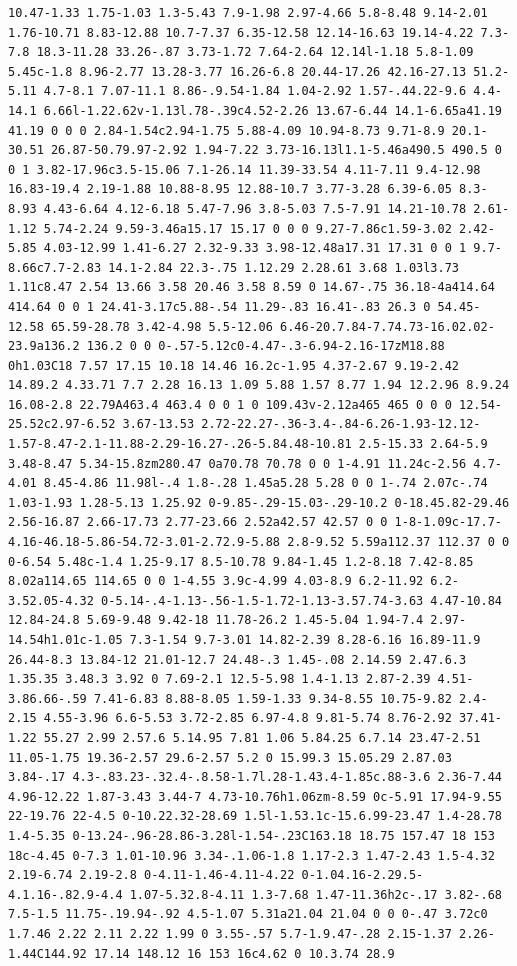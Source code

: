 \documentclass[11pt]{article}
\begin{document}
\begin{enumerate}
\begin{verbatim}
10.47-1.33 1.75-1.03 1.3-5.43 7.9-1.98 2.97-4.66 5.8-8.48 9.14-2.01 1.76-10.71 8.83-12.88 10.7-7.37 6.35-12.58 12.14-16.63 19.14-4.22 7.3-7.8 18.3-11.28 33.26-.87 3.73-1.72 7.64-2.64 12.14l-1.18 5.8-1.09 5.45c-1.8 8.96-2.77 13.28-3.77 16.26-6.8 20.44-17.26 42.16-27.13 51.2-5.11 4.7-8.1 7.07-11.1 8.86-.9.54-1.84 1.04-2.92 1.57-.44.22-9.6 4.4-14.1 6.66l-1.22.62v-1.13l.78-.39c4.52-2.26 13.67-6.44 14.1-6.65a41.19 41.19 0 0 0 2.84-1.54c2.94-1.75 5.88-4.09 10.94-8.73 9.71-8.9 20.1-30.51 26.87-50.79.97-2.92 1.94-7.22 3.73-16.13l1.1-5.46a490.5 490.5 0 0 1 3.82-17.96c3.5-15.06 7.1-26.14 11.39-33.54 4.11-7.11 9.4-12.98 16.83-19.4 2.19-1.88 10.88-8.95 12.88-10.7 3.77-3.28 6.39-6.05 8.3-8.93 4.43-6.64 4.12-6.18 5.47-7.96 3.8-5.03 7.5-7.91 14.21-10.78 2.61-1.12 5.74-2.24 9.59-3.46a15.17 15.17 0 0 0 9.27-7.86c1.59-3.02 2.42-5.85 4.03-12.99 1.41-6.27 2.32-9.33 3.98-12.48a17.31 17.31 0 0 1 9.7-8.66c7.7-2.83 14.1-2.84 22.3-.75 1.12.29 2.28.61 3.68 1.03l3.73 1.11c8.47 2.54 13.66 3.58 20.46 3.58 8.59 0 14.67-.75 36.18-4a414.64 414.64 0 0 1 24.41-3.17c5.88-.54 11.29-.83 16.41-.83 26.3 0 54.45-12.58 65.59-28.78 3.42-4.98 5.5-12.06 6.46-20.7.84-7.74.73-16.02.02-23.9a136.2 136.2 0 0 0-.57-5.12c0-4.47-.3-6.94-2.16-17zM18.88 0h1.03C18 7.57 17.15 10.18 14.46 16.2c-1.95 4.37-2.67 9.19-2.42 14.89.2 4.33.71 7.7 2.28 16.13 1.09 5.88 1.57 8.77 1.94 12.2.96 8.9.24 16.08-2.8 22.79A463.4 463.4 0 0 1 0 109.43v-2.12a465 465 0 0 0 12.54-25.52c2.97-6.52 3.67-13.53 2.72-22.27-.36-3.4-.84-6.26-1.93-12.12-1.57-8.47-2.1-11.88-2.29-16.27-.26-5.84.48-10.81 2.5-15.33 2.64-5.9 3.48-8.47 5.34-15.8zm280.47 0a70.78 70.78 0 0 1-4.91 11.24c-2.56 4.7-4.01 8.45-4.86 11.98l-.4 1.8-.28 1.45a5.28 5.28 0 0 1-.74 2.07c-.74 1.03-1.93 1.28-5.13 1.25.92 0-9.85-.29-15.03-.29-10.2 0-18.45.82-29.46 2.56-16.87 2.66-17.73 2.77-23.66 2.52a42.57 42.57 0 0 1-8-1.09c-17.7-4.16-46.18-5.86-54.72-3.01-2.72.9-5.88 2.8-9.52 5.59a112.37 112.37 0 0 0-6.54 5.48c-1.4 1.25-9.17 8.5-10.78 9.84-1.45 1.2-8.18 7.42-8.85 8.02a114.65 114.65 0 0 1-4.55 3.9c-4.99 4.03-8.9 6.2-11.92 6.2-3.52.05-4.32 0-5.14-.4-1.13-.56-1.5-1.72-1.13-3.57.74-3.63 4.47-10.84 12.84-24.8 5.69-9.48 9.42-18 11.78-26.2 1.45-5.04 1.94-7.4 2.97-14.54h1.01c-1.05 7.3-1.54 9.7-3.01 14.82-2.39 8.28-6.16 16.89-11.9 26.44-8.3 13.84-12 21.01-12.7 24.48-.3 1.45-.08 2.14.59 2.47.6.3 1.35.35 3.48.3 3.92 0 7.69-2.1 12.5-5.98 1.4-1.13 2.87-2.39 4.51-3.86.66-.59 7.41-6.83 8.88-8.05 1.59-1.33 9.34-8.55 10.75-9.82 2.4-2.15 4.55-3.96 6.6-5.53 3.72-2.85 6.97-4.8 9.81-5.74 8.76-2.92 37.41-1.22 55.27 2.99 2.57.6 5.14.95 7.81 1.06 5.84.25 6.7.14 23.47-2.51 11.05-1.75 19.36-2.57 29.6-2.57 5.2 0 15.99.3 15.05.29 2.87.03 3.84-.17 4.3-.83.23-.32.4-.8.58-1.7l.28-1.43.4-1.85c.88-3.6 2.36-7.44 4.96-12.22 1.87-3.43 3.44-7 4.73-10.76h1.06zm-8.59 0c-5.91 17.94-9.55 22-19.76 22-4.5 0-10.22.32-28.69 1.5l-1.53.1c-15.6.99-23.47 1.4-28.78 1.4-5.35 0-13.24-.96-28.86-3.28l-1.54-.23C163.18 18.75 157.47 18 153 18c-4.45 0-7.3 1.01-10.96 3.34-.1.06-1.8 1.17-2.3 1.47-2.43 1.5-4.32 2.19-6.74 2.19-2.8 0-4.11-1.46-4.11-4.22 0-1.04.16-2.29.5-4.1.16-.82.9-4.4 1.07-5.32.8-4.11 1.3-7.68 1.47-11.36h2c-.17 3.82-.68 7.5-1.5 11.75-.19.94-.92 4.5-1.07 5.31a21.04 21.04 0 0 0-.47 3.72c0 1.7.46 2.22 2.11 2.22 1.99 0 3.55-.57 5.7-1.9.47-.28 2.15-1.37 2.26-1.44C144.92 17.14 148.12 16 153 16c4.62 0 10.3.74 28.9 
\end{verbatim}
\end{enumerate}
\end{document}
